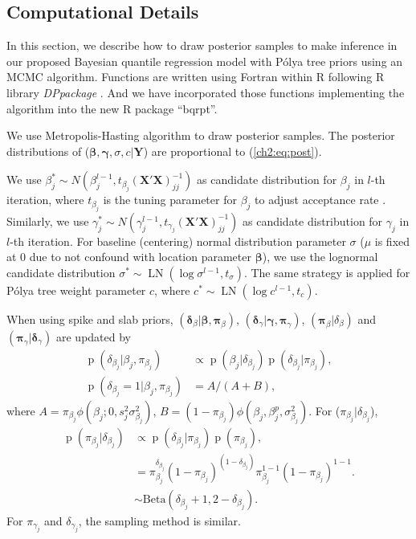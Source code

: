 \documentclass[12pt]{article}
\newcommand{\polya}{P\'{o}lya}
\DeclareMathOperator{\pr}{p}
\DeclareMathOperator{\LN}{LN}
\begin{document}
\subsection{Computational Details}\label{ch2:sec:computation}

In this section, we describe how to draw posterior samples to make
inference in our proposed Bayesian quantile regression model with
\polya{} tree priors using an MCMC algorithm. Functions are written
using Fortran within R \citep{R} following R library
\textit{DPpackage} \citep{DPpackage}. And we have incorporated those
functions implementing the algorithm into the new R \citep{R} package
``bqrpt''.

We use Metropolis-Hasting algorithm to draw posterior samples. The
posterior distributions of ($\bm \beta, \bm \gamma, \sigma, c | \bm
Y$) are proportional to (\ref{ch2:eq:post}).

We use $\beta_j^* \sim N(\beta_j^{l-1}, t_{\beta_j}
(\bm{X'X})^{-1}_{jj})$ as candidate distribution for $\beta_j$ in
$l$-th iteration, where $t_{\beta_j}$ is the tuning parameter for
$\beta_j$ to adjust acceptance rate \citep{jara2009}.  Similarly, we
use $\gamma_j^* \sim N(\gamma_j^{l-1},
t_{\gamma_j}(\bm{X'X})^{-1}_{jj})$ as candidate distribution for
$\gamma_j$ in $l$-th iteration.  For baseline (centering) normal
distribution parameter $\sigma$ ($\mu$ is fixed at 0 due to not
confound with location parameter $\bm \beta$), we use the lognormal
candidate distribution $\sigma^* \sim \LN(\log \sigma^{l-1},
t_{\sigma})$. The same strategy is applied for \polya{} tree weight
parameter $c$, where $c^* \sim \LN(\log c^{l-1}, t_c)$.

When using spike and slab priors,
$(\bm \delta_{\beta}|\bm \beta, \bm \pi_{\beta})$, $(\bm \delta_{\gamma}|\bm
\gamma, \bm \pi_{\gamma})$, $(\bm \pi_{\beta}|\delta_{\beta})$ and
$(\bm \pi_{\gamma}|\bm \delta_{\gamma})$ are updated by
\begin{align*}
  \pr(\delta_{\beta_j}|\beta_j, \pi_{\beta_j}) & \propto \pr(\beta_j |
  \delta_{\beta_j})
  \pr(\delta_{\beta_j}|\pi_{\beta_j}) ,\\
  \pr(\delta_{\beta_j} = 1|\beta_j, \pi_{\beta_j})& = A/(A + B),
\end{align*}
where $A = \pi_{\beta_j}\phi (\beta_j;0, s_j^2\sigma_{\beta_j}^2)$, $B
= (1-\pi_{\beta_j})\phi(\beta_j, \beta_j^p, \sigma_{\beta_j}^2)$.  For
($\pi_{\beta_j}|\delta_{\beta_j}$),
\begin{align*}
  \pr(\pi_{\beta_j}| \delta_{\beta_j}) & \propto \pr(\delta_{\beta_j}|\pi_{\beta_j}) \pr(\pi_{\beta_j}) ,\\
  & = \pi_{\beta_j}^{\delta_{\beta_j}} (1 - \pi_{\beta_j})^{(1 -
    \delta_{\beta_j})}
  \pi_{\beta_j}^{1 - 1}(1 - \pi_{\beta_j})^{1-1}.\\
  & \sim \mbox{Beta}(\delta_{\beta_j} + 1, 2 - \delta_{\beta_j}).
\end{align*}
For $\pi_{\gamma_j}$ and $\delta_{\gamma_j}$, the sampling method is
similar.
\end{document}
